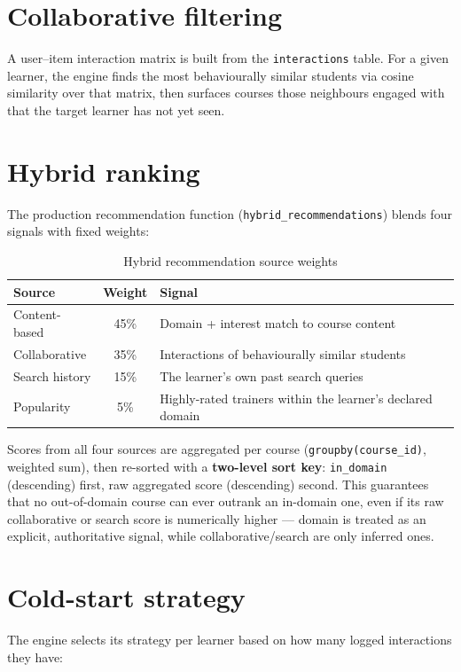 \documentclass[a4paper,12pt]{report}
\begin{document}
\section{Collaborative filtering}
A user--item interaction matrix is built from the \texttt{interactions}
table. For a given learner, the engine finds the most behaviourally
similar students via cosine similarity over that matrix, then surfaces
courses those neighbours engaged with that the target learner has not yet
seen.

\section{Hybrid ranking}
The production recommendation function (\texttt{hybrid\_recommendations})
blends four signals with fixed weights:

\begin{table}[H]
\centering
\caption{Hybrid recommendation source weights}
\begin{tabular}{|P{5cm}|c|P{6cm}|}
\hline
{}
\textbf{Source} & \textbf{Weight} & \textbf{Signal} \\
\hline
Content-based & 45\% & Domain + interest match to course content \\
\hline
Collaborative & 35\% & Interactions of behaviourally similar students \\
\hline
Search history & 15\% & The learner's own past search queries \\
\hline
Popularity & 5\% & Highly-rated trainers within the learner's declared domain \\
\hline
\end{tabular}
\end{table}

Scores from all four sources are aggregated per course
(\texttt{groupby(course\_id)}, weighted sum), then re-sorted with a
\textbf{two-level sort key}: \texttt{in\_domain} (descending) first, raw
aggregated score (descending) second. This guarantees that no
out-of-domain course can ever outrank an in-domain one, even if its raw
collaborative or search score is numerically higher — domain is treated
as an explicit, authoritative signal, while collaborative/search are only
inferred ones.

\section{Cold-start strategy}
The engine selects its strategy per learner based on how many logged
interactions they have:
\end{document}

